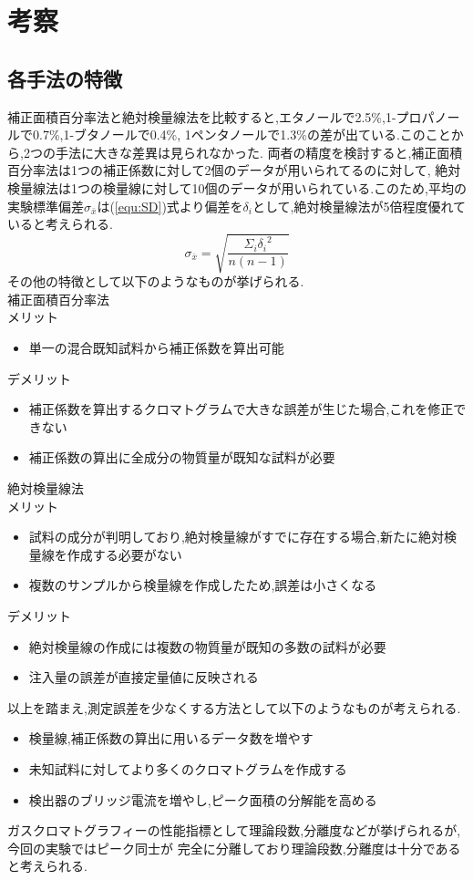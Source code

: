 \section{考察}
\subsection{各手法の特徴}
補正面積百分率法と絶対検量線法を比較すると,エタノールで2.5\%,1-プロパノールで0.7\%,1-ブタノールで0.4\%,
1ペンタノールで1.3\%の差が出ている.このことから,2つの手法に大きな差異は見られなかった.
両者の精度を検討すると,補正面積百分率法は1つの補正係数に対して2個のデータが用いられてるのに対して,
絶対検量線法は1つの検量線に対して10個のデータが用いられている.このため,平均の実験標準偏差$\sigma_{\bar{x}}$は(\ref{equ:SD})式\cite{buturi}より偏差を$\delta_i$として,絶対検量線法が5倍程度優れていると考えられる.
\begin{equation}
  \label{equ:SD}
  \sigma_{\bar{x}}=\sqrt{\frac{{\Sigma_i {}\delta_i}^2}{n(n-1)}}
\end{equation}
その他の特徴として以下のようなものが挙げられる.\\
補正面積百分率法\\メリット
\begin{itemize}
  \item 単一の混合既知試料から補正係数を算出可能
\end{itemize}
デメリット
\begin{itemize}
  \item 補正係数を算出するクロマトグラムで大きな誤差が生じた場合,これを修正できない
  \item 補正係数の算出に全成分の物質量が既知な試料が必要
\end{itemize}
絶対検量線法\\メリット
\begin{itemize}
  \item 試料の成分が判明しており,絶対検量線がすでに存在する場合,新たに絶対検量線を作成する必要がない
  \item 複数のサンプルから検量線を作成したため,誤差は小さくなる
\end{itemize}
デメリット
\begin{itemize}
  \item 絶対検量線の作成には複数の物質量が既知の多数の試料が必要
  \item 注入量の誤差が直接定量値に反映される
\end{itemize}
以上を踏まえ,測定誤差を少なくする方法として以下のようなものが考えられる.
\begin{itemize}
  \item 検量線,補正係数の算出に用いるデータ数を増やす
  \item 未知試料に対してより多くのクロマトグラムを作成する
  \item 検出器のブリッジ電流を増やし,ピーク面積の分解能を高める
\end{itemize}
ガスクロマトグラフィーの性能指標として理論段数,分離度などが挙げられる\cite{BN00380381}が,今回の実験ではピーク同士が
完全に分離しており理論段数,分離度は十分であると考えられる.
